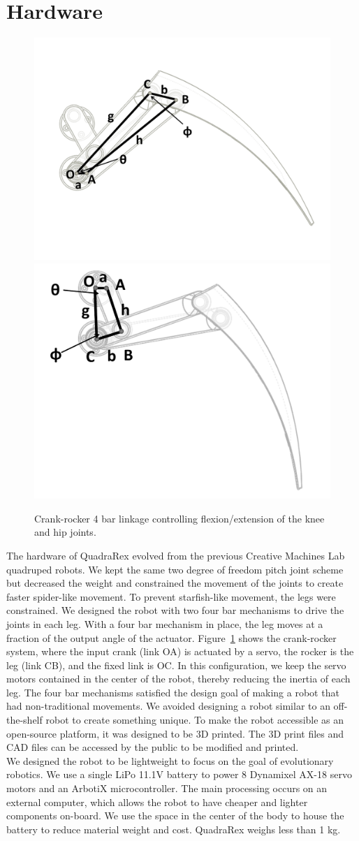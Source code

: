 \documentclass[letterpaper]{article}
\begin{document}
\section{Hardware}

\begin{figure}[t]
\begin{center}
\includegraphics[width=.23\textwidth]{fig3.pdf}
\includegraphics[width=.23\textwidth]{fig4.pdf}
\caption{Crank-rocker 4 bar linkage controlling flexion/extension of
  the knee and hip joints.}
\label{fig3}
\end{center}
\end{figure}


The hardware of QuadraRex evolved from the previous Creative Machines
Lab quadruped robots. We kept the same two degree of freedom pitch
joint scheme but decreased the weight and constrained the movement of
the joints to create faster spider-like movement. To prevent
starfish-like movement, the legs were constrained. We designed the
robot with two four bar mechanisms to drive the joints in each
leg. With a four bar mechanism in place, the leg moves at a fraction
of the output angle of the actuator. Figure~\ref{fig3} shows the
crank-rocker system, where the input crank (link OA) is actuated by a
servo, the rocker is the leg (link CB), and the fixed link is OC. In
this configuration, we keep the servo motors contained in the center
of the robot, thereby reducing the inertia of each leg. The four bar
mechanisms satisfied the design goal of making a robot that had
non-traditional movements. We avoided designing a robot similar to an
off-the-shelf robot to create something unique. To make the robot
accessible as an open-source platform, it was designed to be 3D
printed. The 3D print files and CAD files can be accessed by the
public to be modified and printed.  \\ We designed the robot to be
lightweight to focus on the goal of evolutionary robotics. We use a
single LiPo 11.1V battery to power 8 Dynamixel AX-18 servo motors and
an ArbotiX microcontroller. The main processing occurs on an external
computer, which allows the robot to have cheaper and lighter
components on-board. We use the space in the center of the body to
house the battery to reduce material weight and cost. QuadraRex weighs
less than 1 kg.
\end{document}
